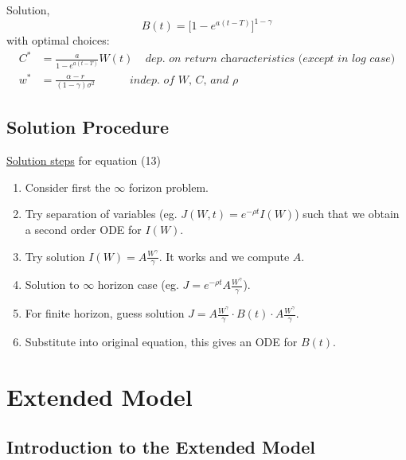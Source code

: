 \documentclass[
14pt,notheorems,hyperref={pdfauthor=whatever}
]{beamer}
\begin{document}
\begin{frame}
Solution,\\
\[ B(t) = \bigg[ 1-e^{a(t-T)}\bigg]^{1-\gamma}\]
with optimal choices:\\
\begin{align*}
    C^* &= \frac{a}{1-e^{a(t-T)}}W(t)\;\;\;\; \textit{dep. on return characteristics (except in log case)}\\
    w^* &= \frac{\alpha-r}{(1-\gamma)\sigma^2}\;\;\;\;\;\;\;\;\;\;\;\textit{indep. of W, C, and $\rho$}
\end{align*}
\end{frame}

\subsection{Solution Procedure}
\begin{frame}
\underline{Solution steps} for equation (13)\\
\begin{enumerate}
    \item Consider first the $\infty$ forizon problem.
    \item Try separation of variables (eg. $J(W,t) = e^{-\rho t} I(W)$) such that we obtain a second order ODE for $I(W)$.
    \item Try solution $I(W) = A \frac{W^\gamma}{\gamma}$. It works and we compute $A$.
    \item Solution to $\infty$ horizon case (eg. $J = e^{-\rho t} A \frac{W^\gamma}{\gamma}$).
    \item For finite horizon, guess solution $J = A \frac{W^\gamma}{\gamma}\cdot B(t) \cdot A\frac{W^\gamma}{\gamma}$.
    \item Substitute into original equation, this gives an ODE for $B(t)$.
\end{enumerate}
\end{frame}

\section{Extended Model}

\subsection{Introduction to the Extended Model}
\end{document}
